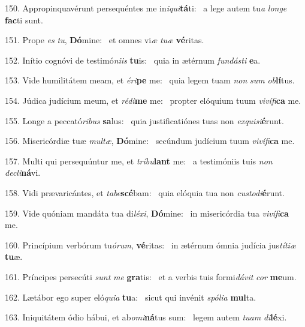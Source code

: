 150. Appropinquavérunt persequéntes me in\textit{i}\textit{qui}\textbf{tá}ti: \ast\  a lege autem tu\textit{a} \textit{lon}\textit{ge} \textbf{fac}ti sunt.\

151. Prope \textit{es} \textit{tu}, \textbf{Dó}mine: \ast\  et omnes vi\textit{æ} \textit{tu}\textit{æ} \textbf{vé}ritas.\

152. Inítio cognóvi de testimó\textit{ni}\textit{is} \textbf{tu}is: \ast\  quia in ætérnum \textit{fun}\textit{dás}\textit{ti} \textbf{e}a.\

153. Vide humilitátem meam, et \textit{é}\textit{ri}\textbf{pe} me: \ast\  quia legem tuam \textit{non} \textit{sum} \textit{ob}\textbf{lí}tus.\

154. Júdica judícium meum, et \textit{réd}\textit{i}\textbf{me} me: \ast\  propter elóquium tuum \textit{vi}\textit{ví}\textit{fi}\textbf{ca} me.\

155. Longe a peccató\textit{ri}\textit{bus} \textbf{sa}lus: \ast\  quia justificatiónes tuas non \textit{ex}\textit{qui}\textit{si}\textbf{é}runt.\

156. Misericórdiæ tuæ \textit{mul}\textit{tæ}, \textbf{Dó}mine: \ast\  secúndum judícium tuum \textit{vi}\textit{ví}\textit{fi}\textbf{ca} me.\

157. Multi qui persequúntur me, et \textit{trí}\textit{bu}\textbf{lant} me: \ast\  a testimóniis tuis \textit{non} \textit{de}\textit{cli}\textbf{ná}vi.\

158. Vidi prævaricántes, et \textit{ta}\textit{be}\textbf{scé}bam: \ast\  quia elóquia tua non \textit{cus}\textit{to}\textit{di}\textbf{é}runt.\

159. Vide quóniam mandáta tua di\textit{lé}\textit{xi}, \textbf{Dó}mine: \ast\  in misericórdia tua \textit{vi}\textit{ví}\textit{fi}\textbf{ca} me.\

160. Princípium verbórum tu\textit{ó}\textit{rum}, \textbf{vé}ritas: \ast\  in ætérnum ómnia judícia jus\textit{tí}\textit{ti}\textit{æ} \textbf{tu}æ.\

161. Príncipes persecúti \textit{sunt} \textit{me} \textbf{gra}tis: \ast\  et a verbis tuis formi\textit{dá}\textit{vit} \textit{cor} \textbf{me}um.\

162. Lætábor ego super eló\textit{qui}\textit{a} \textbf{tu}a: \ast\  sicut qui invénit \textit{spó}\textit{li}\textit{a} \textbf{mul}ta.\

163. Iniquitátem ódio hábui, et ab\textit{o}\textit{mi}\textbf{ná}tus sum: \ast\  legem autem \textit{tu}\textit{am} \textit{di}\textbf{lé}xi.\

